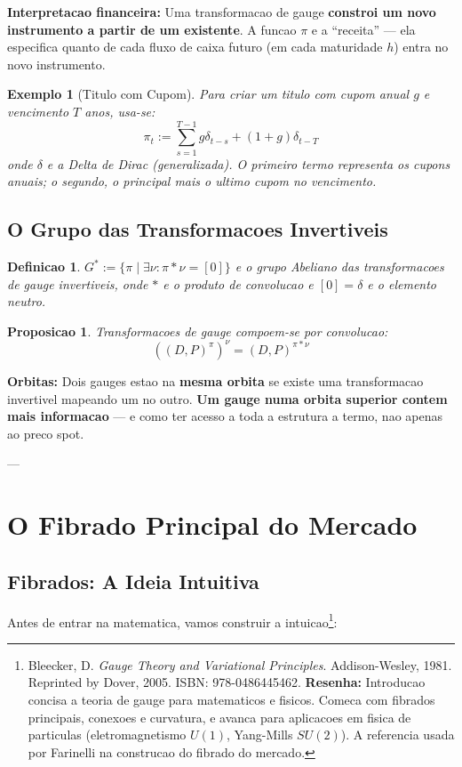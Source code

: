 \documentclass[12pt,a4paper]{article}
\newtheorem{defi}[teo]{Definicao}
\newtheorem{prop}[teo]{Proposicao}
\newtheorem{ex}{Exemplo}[section]
\theoremstyle{remark}
\begin{document}
\textbf{Interpretacao financeira:} Uma transformacao de gauge \textbf{constroi
um novo instrumento a partir de um existente}. A funcao $\pi$ e a ``receita''
— ela especifica quanto de cada fluxo de caixa futuro (em cada maturidade $h$)
entra no novo instrumento.

\begin{ex}[Titulo com Cupom]
Para criar um titulo com cupom anual $g$ e vencimento $T$ anos, usa-se:
\[
\pi_t := \sum_{s=1}^{T-1} g\delta_{t-s} + (1+g)\delta_{t-T}
\]
onde $\delta$ e a Delta de Dirac (generalizada). O primeiro termo representa
os cupons anuais; o segundo, o principal mais o ultimo cupom no vencimento.
\end{ex}

\subsection{O Grupo das Transformacoes Invertiveis}

\begin{defi}
$G^* := \{\pi \mid \exists\nu: \pi * \nu = [0]\}$ e o grupo Abeliano das
transformacoes de gauge invertiveis, onde $*$ e o produto de convolucao e
$[0] = \delta$ e o elemento neutro.
\end{defi}

\begin{prop}
Transformacoes de gauge compoem-se por convolucao:
\[
((D,P)^\pi)^\nu = (D,P)^{\pi * \nu}
\]
\end{prop}

\textbf{Orbitas:} Dois gauges estao na \textbf{mesma orbita} se existe uma
transformacao invertivel mapeando um no outro. \textbf{Um gauge numa orbita
superior contem mais informacao} — e como ter acesso a toda a estrutura a termo,
nao apenas ao preco spot.

---

\section{O Fibrado Principal do Mercado}

\subsection{Fibrados: A Ideia Intuitiva}

Antes de entrar na matematica, vamos construir a intuicao\footnote{Bleecker, D.
\textit{Gauge Theory and Variational Principles}. Addison-Wesley, 1981.
Reprinted by Dover, 2005. ISBN: 978-0486445462. \textbf{Resenha:} Introducao
concisa a teoria de gauge para matematicos e fisicos. Comeca com fibrados
principais, conexoes e curvatura, e avanca para aplicacoes em fisica de
particulas (eletromagnetismo $U(1)$, Yang-Mills $SU(2)$). A referencia usada por
Farinelli na construcao do fibrado do mercado.}:
\end{document}
